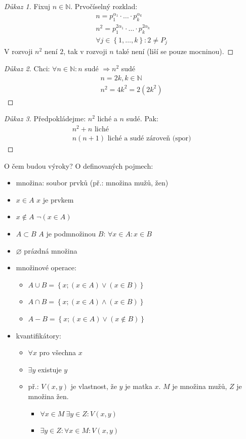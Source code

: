\begin{proof}[Důkaz 1]
	Fixuj $n\in \mathbb{N}$. Prvočíselný rozklad:
	\begin{gather}
		n = p_1^{\alpha_1} \cdot \ldots \cdot p_k^{\alpha_k} \\
		n^2 = p_1^{2\alpha_1} \cdot \ldots \cdot p_k^{2\alpha_k} \\
		\forall j \in \left\{1,\ldots,k\right\}: 2 \neq P_j
	\end{gather}
	V rozvoji $n^2$ není $2$, tak v rozvoji $n$ také není (liší se pouze mocninou).
\end{proof}
\begin{proof}[Důkaz 2]
	Chci: $\forall n \in \mathbb{N}: n$ sudé $\Rightarrow n^2$ sudé
	\begin{gather}
		n = 2k, k\in\mathbb{N} \\
		n^2 = 4k^2 = 2(2k^2)
	\end{gather}
\end{proof}
\begin{proof}[Důkaz 3]
	Předpokládejme: $n^2$ liché a $n$ sudé. Pak:
	\begin{gather}
		n^2 + n \text{ liché}  \\
		n(n + 1) \text{ liché a sudé zároveň (spor)}
	\end{gather}  
\end{proof}
O čem budou výroky? O definovaných pojmech:
\begin{itemize}
	\item množina: soubor prvků (př.: množina mužů, žen)
	\item $x\in A$ \quad $x$ je prvkem
	\item $x\notin A$ \quad $\lnot (x\in A)$
	\item $A\subset B$ \quad $A$ je podmnožinou $B$: $\forall x \in A: x \in B$
	\item $\varnothing$ \quad prázdná množina
	\item množinové operace:
	\begin{itemize}
		\item $A\cup B = \left\{x; (x\in A)\lor(x\in B)\right\}$
		\item $A\cap B = \left\{x; (x\in A)\land(x\in B)\right\}$
		\item $A - B = \left\{x; (x\in A)\lor(x\notin B)\right\}$
	\end{itemize}
	\item kvantifikátory:
	\begin{itemize}
		\item $\forall x$ \quad pro všechna $x$
		\item $\exists y$ \quad existuje $y$
		\item př.: $V(x,y)$ je vlastnost, že $y$ je matka $x$. $M$ je množina
			mužů, $Z$ je množina žen.
		\begin{itemize}
			\item $\forall x \in M~\exists y \in Z: V(x,y)$
			\item $\exists y \in Z: \forall x \in M: V(x,y)$
		\end{itemize}
	\end{itemize}
\end{itemize}

